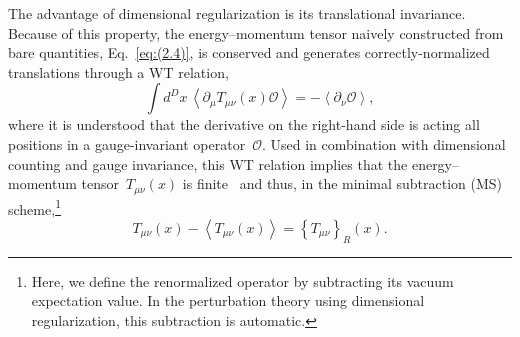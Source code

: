 The advantage of dimensional regularization is its translational invariance.
Because of this property, the energy--momentum tensor naively constructed from
bare quantities, Eq.~\eqref{eq:(2.4)}, is conserved and generates
correctly-normalized translations through a WT relation,
\begin{equation}
   \int d^Dx\,\left\langle\partial_\mu T_{\mu\nu}(x)\mathcal{O}\right\rangle
   =-\left\langle\partial_\nu\mathcal{O}\right\rangle,
\label{eq:(2.5)}
\end{equation}
where it is understood that the derivative on the right-hand side is acting all
positions in a gauge-invariant operator~$\mathcal{O}$. Used in combination with
dimensional counting and gauge invariance, this WT relation implies that the
energy--momentum tensor~$T_{\mu\nu}(x)$ is
finite~\cite{Joglekar:1975jm,Nielsen:1977sy} and thus, in the minimal
subtraction (MS) scheme,\footnote{Here, we define the renormalized operator by
subtracting its vacuum expectation value. In the perturbation theory using
dimensional regularization, this subtraction is automatic.}
\begin{equation}
   T_{\mu\nu}(x)-\left\langle T_{\mu\nu}(x)\right\rangle
   =\left\{T_{\mu\nu}\right\}_R(x).
\label{eq:(2.6)}
\end{equation}

